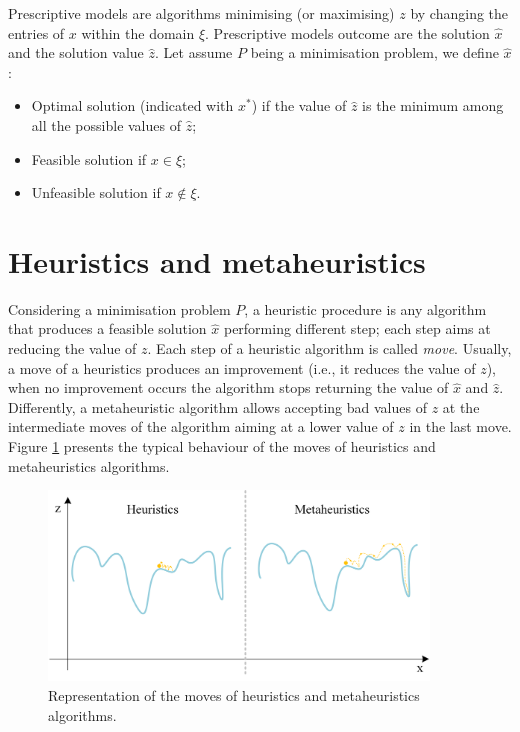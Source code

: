 Prescriptive models are algorithms minimising (or maximising) $z$ by changing the entries of $x$ within the domain $\xi$. Prescriptive models outcome are the solution $\hat{x}$ and the solution value $\hat{z}$. Let assume $P$ being a minimisation problem, we define $\hat{x}$:

\begin{itemize}
    \item Optimal solution (indicated with $x^\ast$) if the value of $\hat{z}$ is the minimum among all the possible values of $\hat{z}$;
    \item Feasible solution if $x\in\xi$;
    \item Unfeasible solution if $x\notin\xi$.
\end{itemize}

\section{Heuristics and metaheuristics}
Considering a minimisation problem $P$, a heuristic procedure is any algorithm that produces a feasible solution $\hat{x}$ performing different step; each step aims at reducing the value of $z$. Each step of a heuristic algorithm is called \textit{move}. Usually, a move of a heuristics produces an improvement (i.e., it reduces the value of $z$), when no improvement occurs the algorithm stops returning the value of $\hat{x}$ and $\hat{z}$. Differently, a metaheuristic algorithm allows accepting bad values of $z$ at the intermediate moves of the algorithm aiming at a lower value of $z$ in the last move. Figure \ref{fig_heurMetaheur} presents the typical behaviour of the moves of heuristics and metaheuristics algorithms.


\begin{figure}[hbt!]
\centering
\includegraphics[width=0.9\textwidth]{SectionLetsMath/prescriptive_fig/fig_heurMetaheur.png}
\captionsetup{type=figure}
\caption{Representation of the moves of heuristics and metaheuristics algorithms.}
\label{fig_heurMetaheur}
\end{figure}

